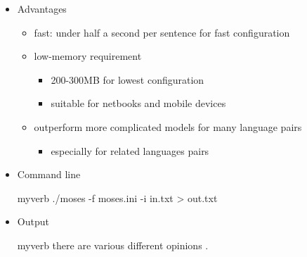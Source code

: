 \documentclass[landscape]{uedslides2C}
\begin{document}
\begin{itemize}
\item Advantages
\vspace{-1mm}
\begin{itemize}
\item fast: under half a second per sentence for fast configuration
\item low-memory requirement
	\begin{itemize}
	\item 200-300MB for lowest configuration
	\item suitable for netbooks and mobile devices
	\end{itemize}
\item outperform more complicated models for many language pairs
	\begin{itemize}
	\item especially for related languages pairs
	\end{itemize}
\end{itemize}
\item Command line   
\vspace{-4mm}
\begin{center}
\begin{SaveVerbatim}{myverb}
 ./moses -f moses.ini -i in.txt > out.txt
\end{SaveVerbatim}
\colorbox{gray}{}
\end{center}
\item Output
\vspace{-4mm}
\begin{center}
\begin{SaveVerbatim}{myverb}
there are various different opinions .
\end{SaveVerbatim}
\colorbox{gray}{}
\end{center}
\end{itemize}
\end{document}
